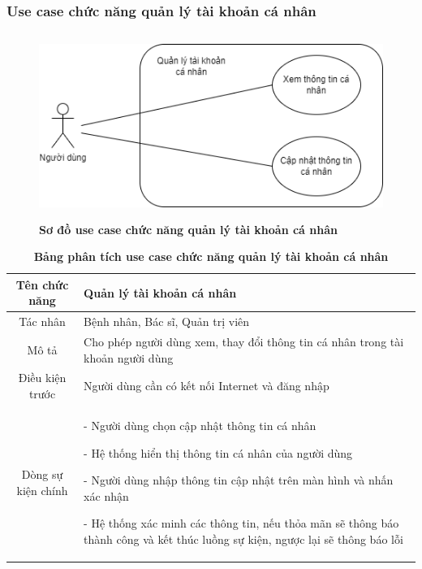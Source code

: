 \subsubsection{Use case chức năng quản lý tài khoản cá nhân}
  \begin{figure}[H]
    \centering
    \includegraphics[width=12cm,height=6cm]{Images/use_case/use_case_manage_info.png}
    \caption[Sơ đồ use case chức năng quản lý tài khoản cá nhân]{\bfseries \fontsize{12pt}{0pt}
    \selectfont Sơ đồ use case chức năng quản lý tài khoản cá nhân}
    \label{use_case_manage_info} %
  \end{figure}

  \begin{table}[H]
    \caption{\bfseries \fontsize{12pt}{0pt}\selectfont Bảng phân tích use case chức năng quản lý tài khoản cá nhân}
    \centering
    \begin{tabularx}{0.9\textwidth}{|c|X|}
      \hline
      \textbf{Tên chức năng} & \textbf{Quản lý tài khoản cá nhân} \\
      \hline
      Tác nhân & Bệnh nhân, Bác sĩ, Quản trị viên \\
      \hline
      Mô tả & Cho phép người dùng xem, thay đổi thông tin cá nhân trong tài khoản người dùng
       \\
      \hline
      Điều kiện trước & Người dùng cần có kết nối Internet và đăng nhập \\
      \hline
      Dòng sự kiện chính & 
        - Người dùng chọn cập nhật thông tin cá nhân

        - Hệ thống hiển thị thông tin cá nhân của người dùng

        - Người dùng nhập thông tin cập nhật trên màn hình và nhấn xác nhận

        - Hệ thống xác minh các thông tin, nếu thỏa mãn sẽ thông báo thành công và kết thúc luồng sự kiện, ngược lại 
        sẽ thông báo lỗi         
        \\
      \hline
    \end{tabularx}
  \end{table}

